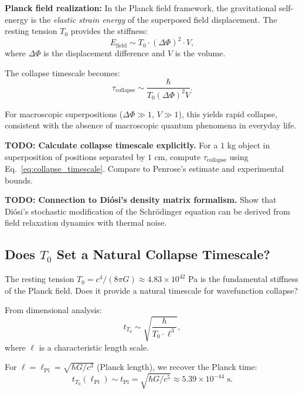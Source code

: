 \documentclass[11pt,a4paper]{article}
\newcommand{\lPl}{\ensuremath{\ell_{\mathrm{Pl}}}}
\newcommand{\tPl}{\ensuremath{t_{\mathrm{Pl}}}}
\newcommand{\Tzero}{\ensuremath{T_0}}
\theoremstyle{definition}
\theoremstyle{remark}
\begin{document}
\textbf{Planck field realization:} In the Planck field framework, the gravitational self-energy is the \emph{elastic strain energy} of the superposed field displacement. The resting tension $\Tzero$ provides the stiffness:
\begin{equation}
\label{eq:field_strain_energy}
E_{\mathrm{field}} \sim \Tzero \cdot (\Delta \Phi)^2 \cdot V,
\end{equation}
where $\Delta \Phi$ is the displacement difference and $V$ is the volume.

The collapse timescale becomes:
\begin{equation}
\label{eq:collapse_timescale}
\tau_{\mathrm{collapse}} \sim \frac{\hbar}{\Tzero (\Delta \Phi)^2 V}.
\end{equation}

For macroscopic superpositions ($\Delta \Phi \gg 1$, $V \gg 1$), this yields rapid collapse, consistent with the absence of macroscopic quantum phenomena in everyday life.

\textbf{TODO: Calculate collapse timescale explicitly.} For a $1$ kg object in superposition of positions separated by $1$ cm, compute $\tau_{\mathrm{collapse}}$ using Eq.~\eqref{eq:collapse_timescale}. Compare to Penrose's estimate and experimental bounds.

\textbf{TODO: Connection to Di\'osi's density matrix formalism.} Show that Di\'osi's stochastic modification of the Schr\"odinger equation can be derived from field relaxation dynamics with thermal noise.

\subsection{Does $\Tzero$ Set a Natural Collapse Timescale?}
\label{sec:Tzero_collapse}

The resting tension $\Tzero = c^4/(8\pi G) \approx 4.83 \times 10^{42}$ Pa is the fundamental stiffness of the Planck field. Does it provide a natural timescale for wavefunction collapse?

From dimensional analysis:
\begin{equation}
\label{eq:Tzero_timescale}
t_{\Tzero} \sim \sqrt{\frac{\hbar}{\Tzero \cdot \ell^3}},
\end{equation}
where $\ell$ is a characteristic length scale.

For $\ell = \lPl = \sqrt{\hbar G/c^3}$ (Planck length), we recover the Planck time:
\begin{equation}
\label{eq:Planck_time_from_Tzero}
t_{\Tzero}(\lPl) \sim \tPl = \sqrt{\hbar G/c^5} \approx 5.39 \times 10^{-44} \text{ s}.
\end{equation}
\end{document}
